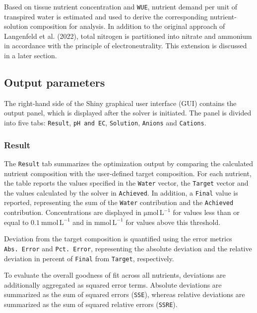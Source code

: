 \documentclass[
  letterpaper,
  DIV=11,
  numbers=noendperiod]{scrreprt}
\begin{document}
Based on tissue nutrient concentration and \texttt{WUE}, nutrient demand
per unit of transpired water is estimated and used to derive the
corresponding nutrient-solution composition for analysis. In addition to
the original approach of Langenfeld et al. (2022), total nitrogen is
partitioned into nitrate and ammonium in accordance with the principle
of electroneutrality. This extension is discussed in a later section.

\subsection{Output parameters}\label{output-parameters}

The right-hand side of the Shiny graphical user interface (GUI) contains
the output panel, which is displayed after the solver is initiated. The
panel is divided into five tabs: \texttt{Result}, \texttt{pH\ and\ EC},
\texttt{Solution}, \texttt{Anions} and \texttt{Cations}.

\subsubsection{Result}\label{result}

The \texttt{Result} tab summarizes the optimization output by comparing
the calculated nutrient composition with the user-defined target
composition. For each nutrient, the table reports the values specified
in the \texttt{Water} vector, the \texttt{Target} vector and the values
calculated by the solver in \texttt{Achieved}. In addition, a
\texttt{Final} value is reported, representing the sum of the
\texttt{Water} contribution and the \texttt{Achieved} contribution.
Concentrations are displayed in \(\mathrm{\mu mol\,L^{-1}}\) for values
less than or equal to \(0.1\ \mathrm{mmol\,L^{-1}}\) and in
\(\mathrm{mmol\,L^{-1}}\) for values above this threshold.

Deviation from the target composition is quantified using the error
metrics \texttt{Abs.\ Error} and \texttt{Pct.\ Error}, representing the
absolute deviation and the relative deviation in percent of
\texttt{Final} from \texttt{Target}, respectively.

To evaluate the overall goodness of fit across all nutrients, deviations
are additionally aggregated as squared error terms. Absolute deviations
are summarized as the sum of squared errors (\texttt{SSE}), whereas
relative deviations are summarized as the sum of squared relative errors
(\texttt{SSRE}).
\end{document}
